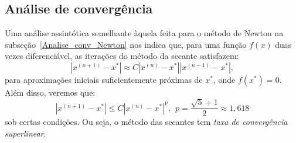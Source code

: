 \subsection{Análise de convergência}

Uma análise assintótica semelhante àquela feita para o método de Newton na subseção~\ref{Analise_conv_Newton} nos indica que, para uma função $f(x)$ duas vezes diferenciável, as iterações do método da secante satisfazem:
\begin{equation}
  |x^{(n+1)} - x^*| \approx C |x^{(n)} - x^*||x^{(n-1)} - x^*|,
\end{equation}
para aproximações iniciais suficientemente próximas de $x^*$, onde $f(x^*) = 0$. Além disso, veremos que:
\begin{equation}
  |x^{(n+1)} - x^*| \leq C |x^{(n)} - x^*|^{p},~~ p=\frac{\sqrt{5}+1}{2}\approx 1,618
\end{equation}
sob certas condições. Ou seja, o método das secantes tem \emph{taxa de convergência superlinear}.

